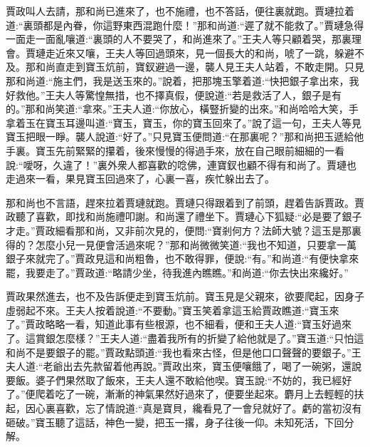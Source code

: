 \begin{parag}
    賈政叫人去請，那和尚已進來了，也不施禮，也不答話，便往裏就跑。賈璉拉着道:“裏頭都是內眷，你這野東西混跑什麼！”那和尚道:“遲了就不能救了。”賈璉急得一面走一面亂嚷道:“裏頭的人不要哭了，和尚進來了。”王夫人等只顧着哭，那裏理會。賈璉走近來又嚷，王夫人等回過頭來，見一個長大的和尚，唬了一跳，躲避不及。那和尚直走到寶玉炕前，寶釵避過一邊，襲人見王夫人站着，不敢走開。只見那和尚道:“施主們，我是送玉來的。”說着，把那塊玉擎着道:“快把銀子拿出來，我好救他。”王夫人等驚惶無措，也不擇真假，便說道:“若是救活了人，銀子是有的。”那和尚笑道:“拿來。”王夫人道:“你放心，橫豎折變的出來。”和尚哈哈大笑，手拿着玉在寶玉耳邊叫道:“寶玉，寶玉，你的寶玉回來了。”說了這一句，王夫人等見寶玉把眼一睜。襲人說道:“好了。”只見寶玉便問道:“在那裏呢？”那和尚把玉遞給他手裏。寶玉先前緊緊的攥着，後來慢慢的得過手來，放在自己眼前細細的一看說:“噯呀，久違了！”裏外衆人都喜歡的唸佛，連寶釵也顧不得有和尚了。賈璉也走過來一看，果見寶玉回過來了，心裏一喜，疾忙躲出去了。
\end{parag}


\begin{parag}
    那和尚也不言語，趕來拉着賈璉就跑。賈璉只得跟着到了前頭，趕着告訴賈政。賈政聽了喜歡，即找和尚施禮叩謝。和尚還了禮坐下。賈璉心下狐疑:“必是要了銀子才走。”賈政細看那和尚，又非前次見的，便問:“寶剎何方？法師大號？這玉是那裏得的？怎麼小兒一見便會活過來呢？”那和尚微微笑道:“我也不知道，只要拿一萬銀子來就完了。”賈政見這和尚粗魯，也不敢得罪，便說:“有。”和尚道:“有便快拿來罷，我要走了。”賈政道:“略請少坐，待我進內瞧瞧。”和尚道:“你去快出來纔好。”
\end{parag}


\begin{parag}
    賈政果然進去，也不及告訴便走到寶玉炕前。寶玉見是父親來，欲要爬起，因身子虛弱起不來。王夫人按着說道:“不要動。”寶玉笑着拿這玉給賈政瞧道:“寶玉來了。”賈政略略一看，知道此事有些根源，也不細看，便和王夫人道:“寶玉好過來了。這賞銀怎麼樣？”王夫人道:“盡着我所有的折變了給他就是了。”寶玉道:“只怕這和尚不是要銀子的罷。”賈政點頭道:“我也看來古怪，但是他口口聲聲的要銀子。”王夫人道:“老爺出去先款留着他再說。”賈政出來，寶玉便嚷餓了，喝了一碗粥，還說要飯。婆子們果然取了飯來，王夫人還不敢給他喫。寶玉說:“不妨的，我已經好了。”便爬着吃了一碗，漸漸的神氣果然好過來了，便要坐起來。麝月上去輕輕的扶起，因心裏喜歡，忘了情說道:“真是寶貝，纔看見了一會兒就好了。虧的當初沒有砸破。”寶玉聽了這話，神色一變，把玉一撂，身子往後一仰。未知死活，下回分解。
\end{parag}